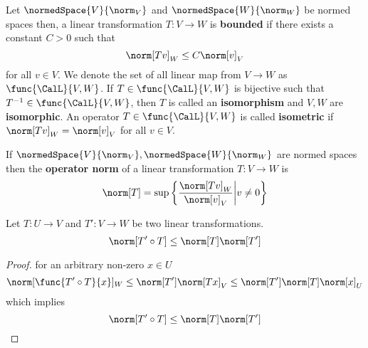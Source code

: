 \begin{definition}
    Let \(\normedSpace{V}{\norm_V}\) and \(\normedSpace{W}{\norm_W}\) be normed spaces then, a linear transformation \(T : V \to W\) is \textbf{bounded} if there exists a constant \(C > 0\) such that
    \begin{equation*}
        \norm[Tv]_W \leq C \norm[v]_V
    \end{equation*}
    for all \(v \in V\). We denote the set of all linear map from \(V \to W\) as \(\func{\CalL}{V,W}\). If \(T \in \func{\CalL}{V,W}\) is bijective such that \(T^{-1} \in \func{\CalL}{V,W}\), then \(T\) is called an \textbf{isomorphism} and \(V,W\) are \textbf{isomorphic}. An operator \(T \in \func{\CalL}{V,W}\) is called \textbf{isometric} if \(\norm[Tv]_W = \norm[v]_V\) for all \(v \in V\).
\end{definition}

\begin{definition}
    If \(\normedSpace{V}{\norm_V},\normedSpace{W}{\norm_W}\) are normed spaces then the \textbf{operator norm} of a linear transformation \(T : V \to W\) is
    \begin{equation*}
        \norm[T] = \sup \left\{\dfrac{\norm[Tv]_W}{\norm[v]_V} \middle| v \neq 0 \right\}
    \end{equation*}
\end{definition}

\begin{proposition}
    Let \(T : U \to V\) and \(T' : V \to W\) be two linear transformations.
    \begin{equation*}
        \norm[T' \circ T] \leq \norm[T] \norm[T']
    \end{equation*}
\end{proposition}

\begin{proof}
    for an arbitrary non-zero \(x \in U\)
    \begin{equation*}
        \norm[\func{T' \circ T}{x}]_W \leq \norm[T'] \norm[Tx]_V \leq \norm[T'] \norm[T] \norm[x]_U
    \end{equation*}
    which implies
    \begin{equation*}
        \norm[T' \circ T] \leq \norm[T] \norm[T']
    \end{equation*}
\end{proof}

